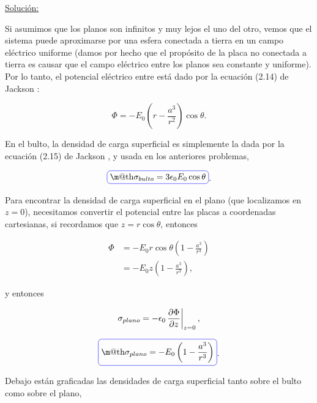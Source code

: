 \documentclass[a4paper,11pt]{article}
\makeatletter
\numberwithin{equation}{section}
\newcommand{\zerodel}{.\kern-\nulldelimiterspace}
\newcommand*{\boxcolor}{blue}
\renewcommand{\boxed}[1]{\textcolor{\boxcolor}{%
\tikz[baseline={([yshift=-1ex]current bounding box.center)}] \node [rectangle, minimum width=1ex,rounded corners,draw] {\normalcolor\m@th$\displaystyle#1$};}}
\makeatother
\begin{document}
\vspace{.3cm}

\underline{Solución:} \vspace{.3cm}

Si asumimos que los planos son infinitos y muy lejos el uno del otro, vemos que 
el sistema puede aproximarse por una esfera conectada a tierra en un campo eléctrico 
uniforme (damos por hecho que el propósito de la placa no conectada a tierra es 
causar que el campo eléctrico entre los planos sea constante y uniforme). Por lo tanto, 
el potencial eléctrico entre está dado por la ecuación (2.14) de Jackson \cite{jackson3}: 

\begin{equation}
 \Phi = - E_0\left(r - \frac{a^3}{r^2}\right)\cos{\theta}.
\end{equation}

En el bulto, la densidad de carga superficial es simplemente la dada por la ecuación 
(2.15) de Jackson \cite{jackson3}, y usada en los anteriores problemas, 

\begin{equation}
 \boxed{\sigma_{bulto} = 3\epsilon_0 E_0 \cos{\theta}}.
\end{equation}

Para encontrar la densidad de carga superficial en el plano (que localizamos en 
$z=0$), necesitamos convertir el potencial entre las placas a coordenadas 
cartesianas, si recordamos que $z = r\cos{\theta}$, entonces 

\begin{align*}
 \Phi &= - E_0 r \cos{\theta}\left(1 - \frac{a^3}{r^3}\right) \\
 &= - E_0 z \left(1 - \frac{a^3}{r^3}\right),
\end{align*}

y entonces 

\begin{equation}
 \sigma_{plano} = - \epsilon_0 \left\zerodel\frac{\partial \Phi}{\partial z}\right|_{z=0},
\end{equation}

\begin{equation}
 \boxed{\sigma_{plano} = - E_0 \left(1 - \frac{a^3}{r^3}\right)}.
\end{equation}

Debajo están graficadas las densidades de carga superficial tanto sobre el bulto 
como sobre el plano,
\end{document}
